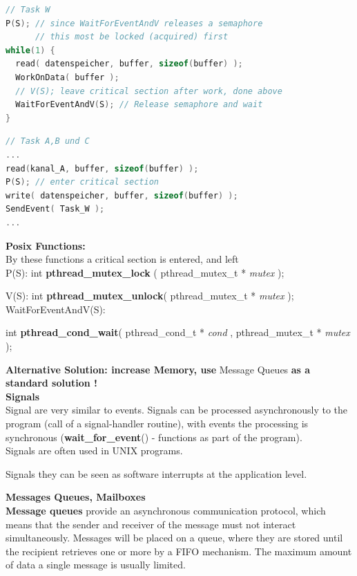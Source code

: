 \begin{lstlisting}[style=mystyle, language=c]
// Task W
P(S); // since WaitForEventAndV releases a semaphore
      // this most be locked (acquired) first
while(1) {
  read( datenspeicher, buffer, sizeof(buffer) );
  WorkOnData( buffer );
  // V(S); leave critical section after work, done above
  WaitForEventAndV(S); // Release semaphore and wait
}
\end{lstlisting}

\begin{lstlisting}[style=mystyle, language=c]
// Task A,B und C
...
read(kanal_A, buffer, sizeof(buffer) );
P(S); // enter critical section
write( datenspeicher, buffer, sizeof(buffer) );
SendEvent( Task_W );
...
\end{lstlisting}

\textbf{Posix Functions:}\\

By these functions a critical section is entered, and left\\

P(S):  int \textbf{pthread\_mutex\_lock }( pthread\_mutex\_t * \textit{mutex });

V(S):  int \textbf{pthread\_mutex\_unlock}( pthread\_mutex\_t * \textit{mutex });\\


WaitForEventAndV(S):

int \textbf{pthread\_cond\_wait}( pthread\_cond\_t * \textit{cond }, pthread\_mutex\_t * \textit{mutex });

\textbf{Alternative Solution: increase Memory, use }Message Queues \textbf{as a standard solution !}\\

{\rot\bf Signals}\\

Signal are very similar to events. Signals can be processed asynchronously to the program (call of a signal-handler routine), with events the processing is synchronous (\textbf{wait\_for\_event}() - functions as part of the program).\\

Signals are often used in UNIX programs.

Signals they can be seen as software interrupts at the application level.

{\rot\bf Messages Queues, Mailboxes}\\

\textbf{Message queues} provide an asynchronous communication protocol, which means that the sender and receiver of the message must not interact simultaneously. Messages will be placed on a queue, where they are stored until the recipient retrieves one or more by a FIFO mechanism. The maximum amount of data a single message is usually limited.\\

